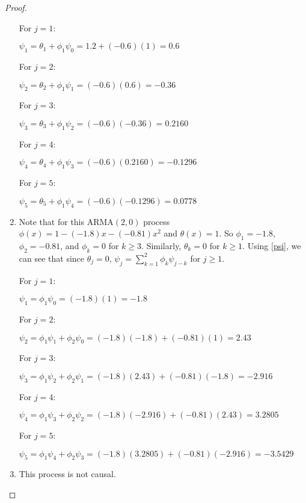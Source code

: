 \documentclass[12pt]{article}
\theoremstyle{definition}
\begin{document}
\begin{proof}
\begin{enumerate}
      For $j=1$:

      $\psi_1 = \theta_1 + \phi_1\psi_0 = 1.2 + (-0.6)(1) = 0.6$

      For $j=2$:

      $\psi_2 = \theta_2 + \phi_1\psi_1 = (-0.6)(0.6) = -0.36$

      For $j=3$:

      $\psi_3 = \theta_3 + \phi_1\psi_2 = (-0.6)(-0.36) = 0.2160$

      For $j=4$:

      $\psi_4 = \theta_4 + \phi_1\psi_3 = (-0.6)(0.2160) = -0.1296$

      For $j=5$:

      $\psi_5 = \theta_5 + \phi_1\psi_4 = (-0.6)(-0.1296) = 0.0778$
    \item Note that for this ARMA$(2, 0)$ process $\phi(x) = 1 - (-1.8)x - (-0.81)x^2$ and
      $\theta(x) = 1$. So $\phi_1 = -1.8$, $\phi_2 = -0.81$, and $\phi_k = 0$ for $k\geq 3$. Similarly,
      $\theta_k = 0$ for $k\geq 1$. Using \eqref{psi}, we can see that
      since $\theta_j = 0$, $\psi_j = \sum_{k=1}^2 \phi_k \psi_{j-k}$ for $j\geq 1$.

      For $j=1$:

      $\psi_1 = \phi_1 \psi_0 = (-1.8)(1) = -1.8$

      For $j=2$:

      $\psi_2 = \phi_1\psi_1 + \phi_2\psi_0 = (-1.8)(-1.8) + (-0.81)(1) = 2.43$

      For $j=3$:

      $\psi_3 = \phi_1\psi_2 + \phi_2\psi_1 = (-1.8)(2.43) + (-0.81)(-1.8) = -2.916$

      For $j=4$:

      $\psi_4 = \phi_1\psi_3 + \phi_2\psi_2 = (-1.8)(-2.916) + (-0.81)(2.43) = 3.2805$

      For $j=5$:

      $\psi_5 = \phi_1\psi_4 + \phi_2\psi_3 = (-1.8)(3.2805) + (-0.81)(-2.916) = -3.5429$
    \item This process is not causal.
  \end{enumerate}
\end{proof}
\end{document}
